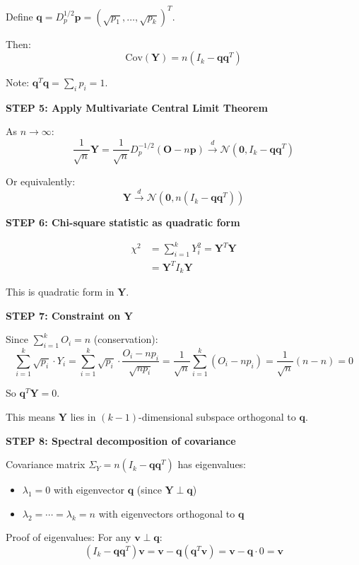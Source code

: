 \documentclass[12pt]{article}
\begin{document}
\begin{solution}
Define $\mathbf{q} = D_p^{1/2}\mathbf{p} = (\sqrt{p_1}, \ldots, \sqrt{p_k})^T$.

Then:
\[
\text{Cov}(\mathbf{Y}) = n(I_k - \mathbf{q}\mathbf{q}^T)
\]

Note: $\mathbf{q}^T\mathbf{q} = \sum_i p_i = 1$.

\textbf{STEP 5: Apply Multivariate Central Limit Theorem}

As $n \to \infty$:
\[
\frac{1}{\sqrt{n}}\mathbf{Y} = \frac{1}{\sqrt{n}}D_p^{-1/2}(\mathbf{O} - n\mathbf{p}) \xrightarrow{d} \mathcal{N}(\mathbf{0}, I_k - \mathbf{q}\mathbf{q}^T)
\]

Or equivalently:
\[
\mathbf{Y} \xrightarrow{d} \mathcal{N}(\mathbf{0}, n(I_k - \mathbf{q}\mathbf{q}^T))
\]

\textbf{STEP 6: Chi-square statistic as quadratic form}

\begin{align*}
\chi^2 &= \sum_{i=1}^k Y_i^2 = \mathbf{Y}^T\mathbf{Y} \\
&= \mathbf{Y}^T I_k \mathbf{Y}
\end{align*}

This is quadratic form in $\mathbf{Y}$.

\textbf{STEP 7: Constraint on $\mathbf{Y}$}

Since $\sum_{i=1}^k O_i = n$ (conservation):
\[
\sum_{i=1}^k \sqrt{p_i} \cdot Y_i = \sum_{i=1}^k \sqrt{p_i} \cdot \frac{O_i - np_i}{\sqrt{np_i}} = \frac{1}{\sqrt{n}}\sum_{i=1}^k (O_i - np_i) = \frac{1}{\sqrt{n}}(n - n) = 0
\]

So $\mathbf{q}^T\mathbf{Y} = 0$.

This means $\mathbf{Y}$ lies in $(k-1)$-dimensional subspace orthogonal to $\mathbf{q}$.

\textbf{STEP 8: Spectral decomposition of covariance}

Covariance matrix $\Sigma_Y = n(I_k - \mathbf{q}\mathbf{q}^T)$ has eigenvalues:
\begin{itemize}
    \item $\lambda_1 = 0$ with eigenvector $\mathbf{q}$ (since $\mathbf{Y} \perp \mathbf{q}$)
    \item $\lambda_2 = \cdots = \lambda_k = n$ with eigenvectors orthogonal to $\mathbf{q}$
\end{itemize}

Proof of eigenvalues: For any $\mathbf{v} \perp \mathbf{q}$:
\[
(I_k - \mathbf{q}\mathbf{q}^T)\mathbf{v} = \mathbf{v} - \mathbf{q}(\mathbf{q}^T\mathbf{v}) = \mathbf{v} - \mathbf{q} \cdot 0 = \mathbf{v}
\]


\end{solution}
\end{document}
